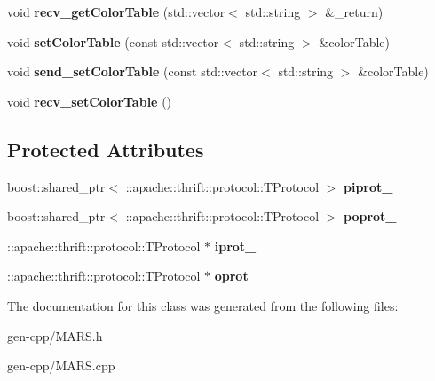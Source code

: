 \begin{DoxyCompactItemize}
void {\bfseries recv\+\_\+get\+Color\+Table} (std\+::vector$<$ std\+::string $>$ \&\+\_\+return)
\item 
\mbox{\label{classMARS_1_1MARSClient_a9c31b7e91c85e44ac6f5dfc211dcc8ee}} 
void {\bfseries set\+Color\+Table} (const std\+::vector$<$ std\+::string $>$ \&color\+Table)
\item 
\mbox{\label{classMARS_1_1MARSClient_a0ee2ae07f28bc4871d8cd8a7a5c5630b}} 
void {\bfseries send\+\_\+set\+Color\+Table} (const std\+::vector$<$ std\+::string $>$ \&color\+Table)
\item 
\mbox{\label{classMARS_1_1MARSClient_ae983c94389ce18d79d17d13e9ef8c6d9}} 
void {\bfseries recv\+\_\+set\+Color\+Table} ()
\end{DoxyCompactItemize}
\subsection*{Protected Attributes}
\begin{DoxyCompactItemize}
\item 
\mbox{\label{classMARS_1_1MARSClient_a6748150d38d84ae1b6a6b75c00b37274}} 
boost\+::shared\+\_\+ptr$<$ \+::apache\+::thrift\+::protocol\+::\+T\+Protocol $>$ {\bfseries piprot\+\_\+}
\item 
\mbox{\label{classMARS_1_1MARSClient_a0aa28c07742ed2a5770ffa46d2a21955}} 
boost\+::shared\+\_\+ptr$<$ \+::apache\+::thrift\+::protocol\+::\+T\+Protocol $>$ {\bfseries poprot\+\_\+}
\item 
\mbox{\label{classMARS_1_1MARSClient_adb00f31b62609abab17a40c5d80f2073}} 
\+::apache\+::thrift\+::protocol\+::\+T\+Protocol $\ast$ {\bfseries iprot\+\_\+}
\item 
\mbox{\label{classMARS_1_1MARSClient_ac74389691d90dde0029d06a4e3d01553}} 
\+::apache\+::thrift\+::protocol\+::\+T\+Protocol $\ast$ {\bfseries oprot\+\_\+}
\end{DoxyCompactItemize}


The documentation for this class was generated from the following files\+:\begin{DoxyCompactItemize}
\item 
gen-\/cpp/M\+A\+R\+S.\+h\item 
gen-\/cpp/M\+A\+R\+S.\+cpp\end{DoxyCompactItemize}
